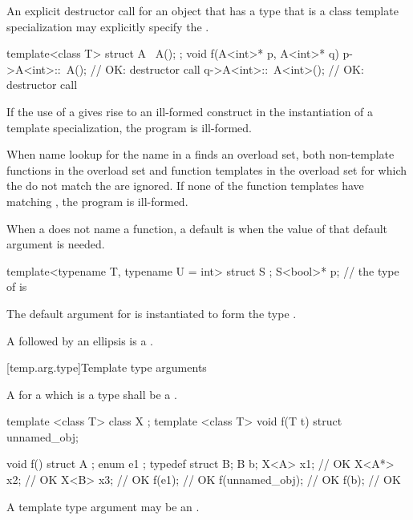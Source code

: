 \pnum
An explicit destructor call for an object that has a type
that is a class template specialization may explicitly specify the
.
\begin{example}
\begin{codeblock}
template<class T> struct A {
  ~A();
};
void f(A<int>* p, A<int>* q) {
  p->A<int>::~A();              // OK: destructor call
  q->A<int>::~A<int>();         // OK: destructor call
}
\end{codeblock}
\end{example}

\pnum
If the use of a
gives rise to an ill-formed construct in the instantiation of a
template specialization, the program is ill-formed.

\pnum
When name lookup for the name in a
finds an overload set, both non-template functions in the overload
set and function templates in the overload set for
which the
do not match the
are ignored.
If none of the function templates have matching
,
the program is ill-formed.

\pnum
When a  does not name a function,
a default  is
when the value of that default argument is needed.
\begin{example}
\begin{codeblock}
template<typename T, typename U = int> struct S { };
S<bool>* p;         // the type of  is 
\end{codeblock}
The default argument for  is instantiated to form the type .
\end{example}

\pnum
A  followed by an ellipsis is
a .

[temp.arg.type]{Template type arguments}

\pnum
A
for a
which is a type
shall be a
.

\pnum
\begin{example}
\begin{codeblock}
template <class T> class X { };
template <class T> void f(T t) { }
struct { } unnamed_obj;

void f() {
  struct A { };
  enum { e1 };
  typedef struct { } B;
  B b;
  X<A> x1;          // OK
  X<A*> x2;         // OK
  X<B> x3;          // OK
  f(e1);            // OK
  f(unnamed_obj);   // OK
  f(b);             // OK
}
\end{codeblock}
\end{example}
\begin{note}
A template type argument may be an .
\end{note}

